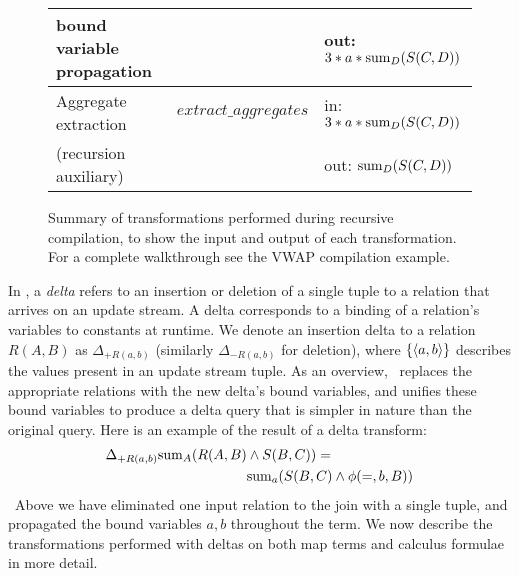 \begin{figure*}
\begin{center}
\begin{tabular}{|l|c|l|}
\\
bound variable propagation & & out:
    $3*a*\mathrm{sum}_{D}(S(C,D))$
\\
\hline Aggregate extraction        & $extract\_aggregates$
& in: $3*a*\mathrm{sum}_{D}(S(C,D))$
\\
(recursion auxiliary) & & out: $\mathrm{sum}_{D}(S(C,D))$
\\
\hline
\end{tabular}
\caption{Summary of transformations performed during recursive compilation, to
show the input and output of each transformation. For a complete walkthrough see
the VWAP compilation example.}
\label{fig:methodsummary}
\end{center}
\end{figure*}


In \compiler, a \textit{delta} refers to an insertion or deletion of a single
tuple to a relation that arrives on an update stream. A delta corresponds to a
binding of a relation's variables to constants at runtime. We denote an
insertion delta to a relation $R(A,B)$ as $\Delta_{+R(a,b)}$ (similarly
$\Delta_{-R(a,b)}$ for deletion), where $\{{\langle a,b\rangle}\}$ describes the values
present in an update stream tuple. As an overview, \compiler\ replaces the
appropriate relations with the new delta's bound variables, and unifies these
bound variables to produce a delta query that is simpler in nature than the
original query.
Here is an example of the result of a delta transform:
\begin{align*}
\Delta_{+R(a,b)} \mathrm{sum}_{A}(R(A,B) & \wedge S(B,C)) =\\
& \mathrm{sum}_{a}(S(B,C) \wedge \phi(=,b,B))
\end{align*}
\noindent~Above we have eliminated one input relation to the join
with a single tuple, and propagated the bound variables $a,b$ throughout the
term.  We now describe the transformations performed with deltas on both map
terms and calculus formulae in more detail.

